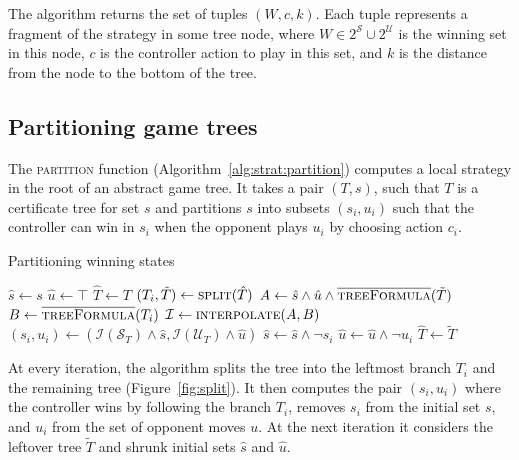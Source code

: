 The algorithm returns the set of tuples $(W, c, k)$.  Each tuple represents a fragment of the strategy in some tree node, where $W \in 2^{\mathcal{S}} \cup 2^{\mathcal{U}}$ is the winning set in this node, $c$ is the controller action to play in this set, and $k$ is the distance from the node to the bottom of the tree.

\subsection{Partitioning game trees}

The \textsc{partition} function (Algorithm~\ref{alg:strat:partition}) computes a local strategy in the root of an abstract game tree.  It takes a pair $(T, s)$, such that $T$ is a certificate tree for set $s$ and partitions $s$ into subsets $(s_i, u_i)$ such that the controller can win in $s_i$ when the opponent plays $u_i$ by choosing action $c_i$.

\begin{algorithm}[t]
   \caption{Partitioning winning states}\label{alg:strat:partition}
   \begin{algorithmic}[1]
        \State $\hat{s} \gets s$
        \State $\hat{u} \gets \top$
        \State $\hat{T} \gets T$
        \State $(T_i, \tilde{T}) \gets \Call{split}{\hat{T}}$\label{alg:partition:split}
            \State $A \gets \hat{s} \land \hat{u} \land \Call{\opptf}{\tilde{T}} $ \label{alg:strat:partition:Bi}
            \State $B \gets \Call{\opptf}{T_i} $ \label{alg:strat:partition:Ai}
            \State $\mathcal{I} \gets \Call{interpolate}{A, B}$\label{alg:partition:I}
            \State $(s_i, u_i) \gets (\mathcal{I}(\mathcal{S}_T) \land \hat{s}, \mathcal{I}(\mathcal{U}_T) \land \hat{u})$\label{alg:partition:Ii}
            \State $\hat{s} \gets \hat{s} \land \neg s_i$
            \State $\hat{u} \gets \hat{u} \land \neg u_i$
            \State $\hat{T} \gets \tilde{T}$\label{alg:partition:upd}
        \EndFor
        \State \Return{$[(T_1, s_1, u_1),\ldots, (T_j, s_j, u_j)]$} \label{alg:strat:partition:return}
        \EndFunction
    \end{algorithmic}
\end{algorithm}

At every iteration, the algorithm splits the tree into the leftmost branch $T_i$ and the remaining tree (Figure~\ref{fig:split}).  It then computes the pair $(s_i, u_i)$ where the controller wins by following the branch $T_i$, removes $s_i$ from the initial set $s$, and $u_i$ from the set of opponent moves $u$.  At the next iteration it considers the leftover tree $\tilde{T}$ and shrunk initial sets $\hat{s}$ and $\hat{u}$.

